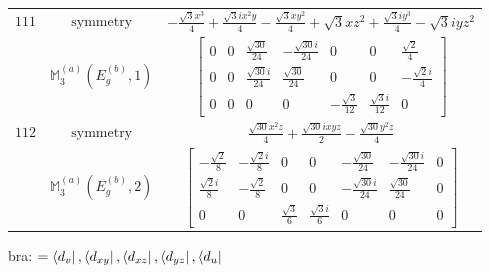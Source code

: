 \documentclass[fleqn,8pt,landscape]{jsarticle}
\begin{document}
\begin{longtable}{ccc}
$ 111 $ & $ \text{symmetry} $ & $ - \frac{\sqrt{3} x^{3}}{4} + \frac{\sqrt{3} i x^{2} y}{4} - \frac{\sqrt{3} x y^{2}}{4} + \sqrt{3} x z^{2} + \frac{\sqrt{3} i y^{3}}{4} - \sqrt{3} i y z^{2} $ \\
$  $ & $ \mathbb{M}_{3}^{(a)}(E_{g}^{(b)},1) $ & $ \begin{bmatrix} 0 & 0 & \frac{\sqrt{30}}{24} & - \frac{\sqrt{30} i}{24} & 0 & 0 & \frac{\sqrt{2}}{4} \\ 0 & 0 & \frac{\sqrt{30} i}{24} & \frac{\sqrt{30}}{24} & 0 & 0 & - \frac{\sqrt{2} i}{4} \\ 0 & 0 & 0 & 0 & - \frac{\sqrt{3}}{12} & \frac{\sqrt{3} i}{12} & 0 \end{bmatrix} $ \\ \hline
$ 112 $ & $ \text{symmetry} $ & $ \frac{\sqrt{30} x^{2} z}{4} + \frac{\sqrt{30} i x y z}{2} - \frac{\sqrt{30} y^{2} z}{4} $ \\
$  $ & $ \mathbb{M}_{3}^{(a)}(E_{g}^{(b)},2) $ & $ \begin{bmatrix} - \frac{\sqrt{2}}{8} & - \frac{\sqrt{2} i}{8} & 0 & 0 & - \frac{\sqrt{30}}{24} & - \frac{\sqrt{30} i}{24} & 0 \\ \frac{\sqrt{2} i}{8} & - \frac{\sqrt{2}}{8} & 0 & 0 & - \frac{\sqrt{30} i}{24} & \frac{\sqrt{30}}{24} & 0 \\ 0 & 0 & \frac{\sqrt{3}}{6} & \frac{\sqrt{3} i}{6} & 0 & 0 & 0 \end{bmatrix} $ \\ \hline
\end{longtable}
bra: $=\bra{d_{v}}, \bra{d_{xy}}, \bra{d_{xz}}, \bra{d_{yz}}, \bra{d_{u}}$
\end{document}
